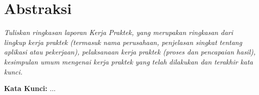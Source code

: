 \chapter*{Abstraksi}
\textit{Tuliskan ringkasan laporan Kerja Praktek, yang merupakan ringkasan dari lingkup kerja praktek (termasuk nama perusahaan, penjelasan singkat tentang aplikasi atau pekerjaan), pelaksanaan kerja praktek (proses dan pencapaian hasil), kesimpulan umum mengenai kerja praktek yang telah dilakukan dan terakhir kata kunci.}

\vspace{5em}

\begin{flushleft}
\textbf{Kata Kunci:} $\ldots$
\end{flushleft}